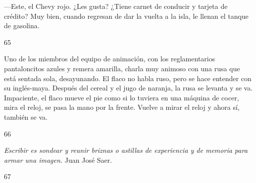 \documentclass[12pt,twoside,openright,a5paper]{book}
\begin{document}
---Este, el Chevy rojo. ¿Les gusta? ¿Tiene carnet de conducir y tarjeta de
crédito? Muy bien, cuando regresan de dar la vuelta a la isla, le llenan
el tanque de gasolina.

\vspace{0.5cm}

\hrulefill \hspace{0.1cm}\decofourleft\hspace{0.2cm} 65 \hspace{0.2cm}\decofourright \hspace{0.1cm}\hrulefill

\nopagebreak

\vspace{0.5cm}

\nopagebreak

Uno de los miembros del equipo de animación, con los reglamentarios
pantaloncitos azules y remera amarilla, charla muy animoso con una rusa que
está sentada sola, desayunando. El flaco no habla ruso, pero se hace
entender con su inglés-maya. Después del cereal y el jugo de naranja,
la rusa se levanta y se va. Impaciente, el flaco mueve el pie como si lo
tuviera en una máquina de cocer, mira el reloj, se pasa la mano por la
frente. Vuelve a mirar el reloj y ahora sí, también se va.

\vspace{0.5cm}

\hrulefill \hspace{0.1cm}\decofourleft\hspace{0.2cm} 66 \hspace{0.2cm}\decofourright \hspace{0.1cm}\hrulefill

\nopagebreak

\vspace{0.5cm}

\nopagebreak

 \emph{Escribir es sondear y reunir briznas o
astillas de experiencia y de memoria para armar una imagen.} Juan José Saer.

\vspace{0.5cm}

\hrulefill \hspace{0.1cm}\decofourleft\hspace{0.2cm} 67 \hspace{0.2cm}\decofourright \hspace{0.1cm}\hrulefill

\nopagebreak
\end{document}

